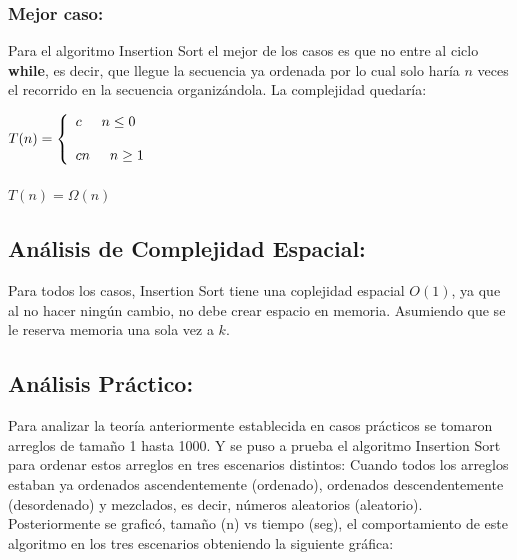 \documentclass[12pt,spanish]{article}
\theoremstyle{definition}
\begin{document}
\subsubsection{Mejor caso:}{}
Para el algoritmo Insertion Sort el mejor de los casos es que no entre al ciclo \textbf{while}, es decir, que llegue la secuencia ya ordenada por lo cual solo haría $n$ veces el recorrido en la secuencia organizándola. La complejidad quedaría:

$T(n)= \left\{ \begin{array}{lcc}
              c \hspace{0.5cm}  n \leq 0 \\
              \\cn \hspace{0.5cm} n \geq 1 \\
              \end{array}
    \right.$ \\ \\
$T(n) = \Omega (n)$

\subsection{ Análisis de Complejidad Espacial:}
Para todos los casos, Insertion Sort tiene una coplejidad espacial $O(1)$, ya que al no hacer ningún cambio, no debe crear espacio en memoria. Asumiendo que se le reserva memoria una sola vez a $k$.

\subsection{ Análisis Práctico:}
Para analizar la teoría anteriormente establecida en casos prácticos se tomaron arreglos de tamaño 1 hasta 1000. Y se puso a prueba el algoritmo Insertion Sort para ordenar estos arreglos en tres escenarios distintos: Cuando todos los arreglos estaban ya ordenados ascendentemente (ordenado), ordenados descendentemente (desordenado) y mezclados, es decir, números aleatorios (aleatorio). Posteriormente se graficó, tamaño (n) vs tiempo (seg), el comportamiento de este algoritmo en los tres escenarios obteniendo la siguiente gráfica:
\end{document}
